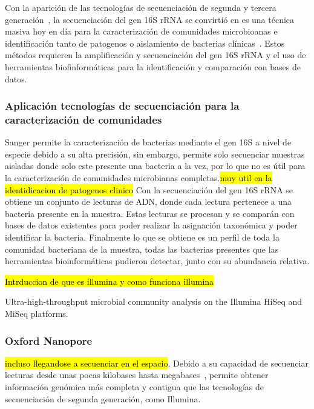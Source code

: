 Con la aparición de las tecnologías de secuenciación de segunda y tercera generación~\cite{janda200716s,pollock2018madness}, la secuenciación del gen 16S rRNA se convirtió en es una técnica masiva hoy en día para la caracterización de comunidades microbioanas e identificación tanto de patogenos o aislamiento de bacterias clínicas~\cite{patel200116s}.
Estos métodos requieren la amplificación y secuenciación del gen 16S rRNA y el uso de herramientas biofinformáticas para la identificación y comparación con bases de datos.

\subsubsection{Aplicación tecnologías de secuenciación para la caracterización de comunidades}
Sanger permite la caracterización de bacterias mediante el gen 16S a nivel de especie debido a su alta precisión, sin embargo, permite solo secuenciar muestras aisladas donde solo este presente una bacteria a la vez, por lo que no es útil para la caracterización de comunidades microbianas completas.\hl{muy util en la identidicacion de patogenos clinico}
Con la secuenciación del gen 16S rRNA se obtiene un conjunto de lecturas de ADN, donde cada lectura pertenece a una bacteria presente en la muestra. Estas lecturas se procesan y se comparán con bases de datos existentes para poder realizar la asignación taxonómica y poder identificar la bacteria. Finalmente lo que se obtiene es un perfil de toda la comunidad bacteriana de la muestra, todas las bacterias presentes que las herramientas bioinformáticas pudieron detectar, junto con su abundancia relativa.


\hl{Intrduccion de que es illumina y como funciona illumina}

Ultra-high-throughput microbial community analysis on the Illumina HiSeq and MiSeq platforms.


\subsubsection{Oxford Nanopore}
\hl{incluso llegandose a secuenciar en el espacio},
Debido a su capacidad de secuenciar lecturas desde unas pocas kilobases hasta megabases~\cite{amarasinghe2020opportunities}, permite obtener información genómica más completa y contigua que las tecnologías de secuenciación de segunda generación, como Illumina.

